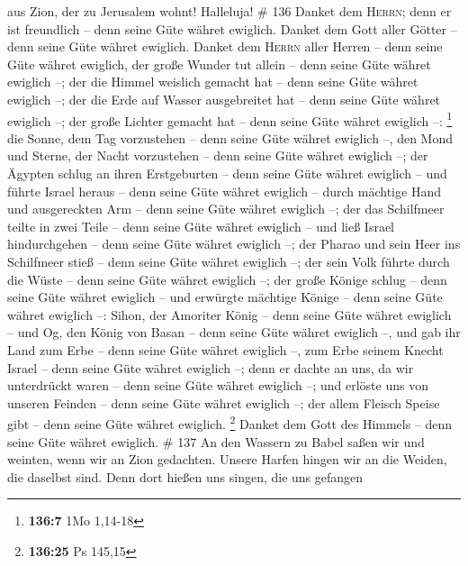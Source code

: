 aus Zion, der zu Jerusalem wohnt! Halleluja! \# 136 
Danket dem \textsc{Herrn}; denn er ist freundlich -- denn seine Güte
währet ewiglich.  Danket dem Gott aller Götter -- denn
seine Güte währet ewiglich.  Danket dem \textsc{Herrn}
aller Herren -- denn seine Güte währet ewiglich,  der
große Wunder tut allein -- denn seine Güte währet ewiglich --;
 der die Himmel weislich gemacht hat -- denn seine Güte
währet ewiglich --;  der die Erde auf Wasser ausgebreitet
hat -- denn seine Güte währet ewiglich --;  der große
Lichter gemacht hat -- denn seine Güte währet ewiglich --: \footnote{\textbf{136:7}
  1Mo 1,14-18}  die Sonne, dem Tag vorzustehen -- denn
seine Güte währet ewiglich --,  den Mond und Sterne, der
Nacht vorzustehen -- denn seine Güte währet ewiglich --; 
der Ägypten schlug an ihren Erstgeburten -- denn seine Güte währet
ewiglich --  und führte Israel heraus -- denn seine Güte
währet ewiglich --  durch mächtige Hand und ausgereckten
Arm -- denn seine Güte währet ewiglich --;  der das
Schilfmeer teilte in zwei Teile -- denn seine Güte währet ewiglich --
 und ließ Israel hindurchgehen -- denn seine Güte währet
ewiglich --;  der Pharao und sein Heer ins Schilfmeer
stieß -- denn seine Güte währet ewiglich --;  der sein
Volk führte durch die Wüste -- denn seine Güte währet ewiglich --;
 der große Könige schlug -- denn seine Güte währet
ewiglich --  und erwürgte mächtige Könige -- denn seine
Güte währet ewiglich --:  Sihon, der Amoriter König --
denn seine Güte währet ewiglich --  und Og, den König von
Basan -- denn seine Güte währet ewiglich --,  und gab ihr
Land zum Erbe -- denn seine Güte währet ewiglich --,  zum
Erbe seinem Knecht Israel -- denn seine Güte währet ewiglich --;
 denn er dachte an uns, da wir unterdrückt waren -- denn
seine Güte währet ewiglich --;  und erlöste uns von
unseren Feinden -- denn seine Güte währet ewiglich --; 
der allem Fleisch Speise gibt -- denn seine Güte währet ewiglich.
\footnote{\textbf{136:25} Ps 145,15}  Danket dem Gott des
Himmels -- denn seine Güte währet ewiglich. \# 137  An den
Wassern zu Babel saßen wir und weinten, wenn wir an Zion gedachten.
 Unsere Harfen hingen wir an die Weiden, die daselbst
sind.  Denn dort hießen uns singen, die uns gefangen
